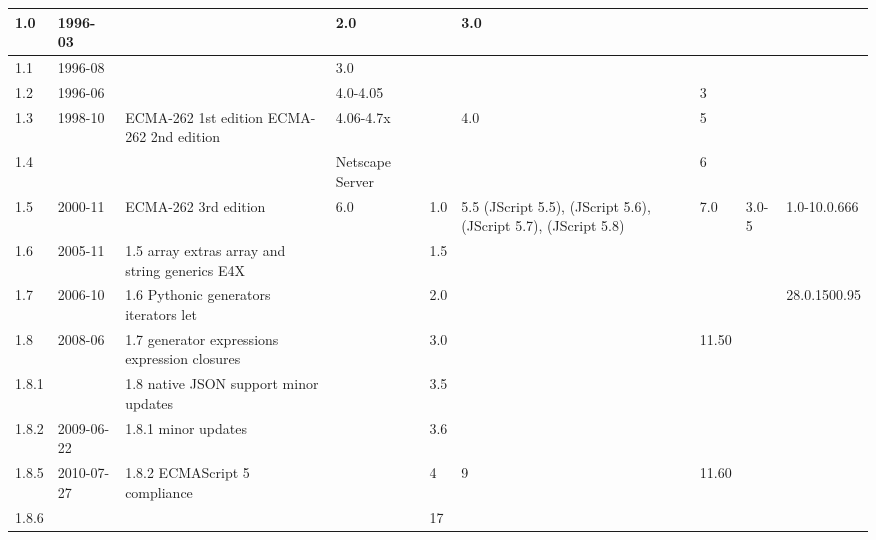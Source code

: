\begin{longtable}{|m{15pt}|m{35pt}|m{80pt}|m{50pt}|m{15pt}|m{50pt}|m{15pt}|m{20pt}|m{40pt}|}
\hline
1.0		&1996-03	&														&2.0					&								&3.0				&			&		&				\\
\hline
1.1		&1996-08	&														&3.0					&								&					&			&		&				\\
\hline
1.2		&1996-06	&														&4.0-4.05				&								&					&3			&		&				\\
\hline
1.3		&1998-10	&ECMA-262 1st edition \newline ECMA-262 2nd edition			&4.06-4.7x				&								&4.0				&5			&		&				\\
\hline
1.4		&			&														&Netscape Server		&								&					&6			&		&				\\
\hline
1.5		&2000-11	&ECMA-262 3rd edition									&6.0					&1.0							&5.5 (JScript 5.5),
																																		\newline 6 (JScript 5.6),
																																		\newline 7 (JScript 5.7),
																																		\newline 8 (JScript 5.8)	&7.0	&3.0-5	&1.0-10.0.666\\
\hline
1.6		&2005-11	&1.5 \newline  array extras \newline  array and string generics \newline  E4X 	&						&1.5							&					&			&		&				\\
\hline
1.7		&2006-10	&1.6 \newline  Pythonic generators \newline  iterators \newline  let			&						&2.0							&					&			&		&28.0.1500.95\\
\hline
1.8		&2008-06	&1.7 \newline  generator expressions \newline  expression closures		&						&3.0							&					&11.50		&		&				\\
\hline
1.8.1	&			&1.8 \newline  native JSON support \newline  minor updates			&						&3.5							&					&			&		&				\\
\hline
1.8.2	&2009-06-22&1.8.1 \newline  minor updates								&						&3.6							&					&			&		&				\\
\hline
1.8.5	&2010-07-27&1.8.2 \newline  ECMAScript 5 compliance					&						&4								&9					&11.60		&		&				\\
\hline
1.8.6	&			&														&						&17							&					&			&		&				\\
\hline
\end{longtable}

